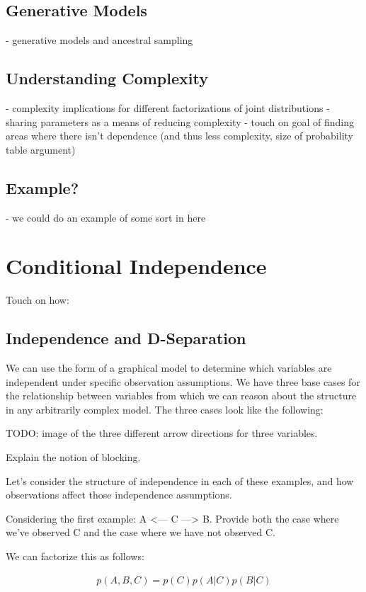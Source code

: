 \subsection{Generative Models}
- generative models and ancestral sampling

\subsection{Understanding Complexity}
- complexity implications for different factorizations of joint distributions
- sharing parameters as a means of reducing complexity
- touch on goal of finding areas where there isn't dependence (and thus less complexity, size of probability table argument)

\subsection{Example?}
- we could do an example of some sort in here

\section{Conditional Independence}
Touch on how:

\subsection{Independence and D-Separation}
We can use the form of a graphical model to determine which variables are independent under specific observation assumptions. We have three base cases for the relationship between variables from which we can reason about the structure in any arbitrarily complex model. The three cases look like the following:

TODO: image of the three different arrow directions for three variables.

Explain the notion of blocking.

Let's consider the structure of independence in each of these examples, and how observations affect those independence assumptions.

Considering the first example: A <--- C ---> B. Provide both the case where we've observed C and the case where we have not observed C.

We can factorize this as follows:

\begin{align*}
	p(A, B, C) = p(C) p(A | C) p(B | C)
\end{align*}


